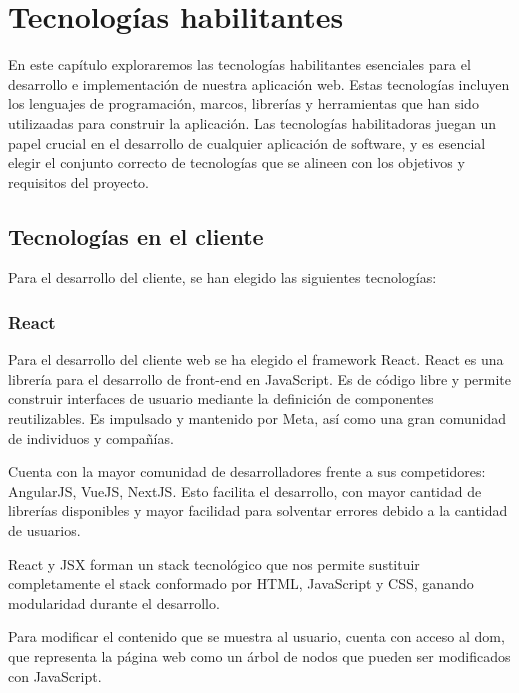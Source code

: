 \chapter{Tecnologías habilitantes}
\label{chap:enabling_technologies}


En este capítulo exploraremos las tecnologías habilitantes esenciales para el desarrollo e implementación de nuestra aplicación web. Estas tecnologías incluyen los lenguajes de programación, marcos, librerías y herramientas que han sido utilizaadas para construir la aplicación. Las tecnologías habilitadoras juegan un papel crucial en el desarrollo de cualquier aplicación de software, y es esencial elegir el conjunto correcto de tecnologías que se alineen con los objetivos y requisitos del proyecto.

\section{Tecnologías en el cliente}
\label{tec_hab:client}

Para el desarrollo del cliente, se han elegido las siguientes tecnologías:

\subsection{React}
\label{tec_hab:react}


Para el desarrollo del cliente web se ha elegido el framework React. React es una librería para el desarrollo de front-end en JavaScript. Es de código libre y permite construir interfaces de usuario mediante la definición de componentes reutilizables. Es impulsado y mantenido por Meta, así como una gran comunidad de individuos y compañías.

Cuenta con la mayor comunidad de desarrolladores frente a sus competidores: AngularJS, VueJS, NextJS. Esto facilita el desarrollo, con mayor cantidad de librerías disponibles y mayor facilidad para solventar errores debido a la cantidad de usuarios.

React y JSX forman un stack tecnológico que nos permite sustituir completamente el stack conformado por HTML, JavaScript y CSS, ganando modularidad durante el desarrollo.

Para modificar el contenido que se muestra al usuario, cuenta con acceso al \acrshort{dom}, que representa la página web como un árbol de nodos que pueden ser modificados con JavaScript.

